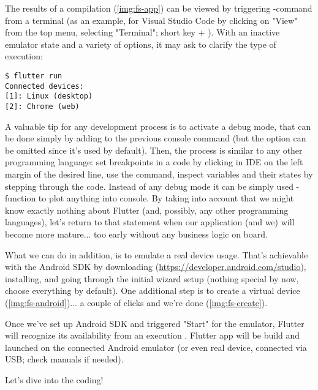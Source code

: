 \noindent The results of a compilation (\cref{img:fs-app}) can be viewed by triggering -command from a 
terminal (as an example, for Visual Studio Code by clicking on "View" from the top menu, selecting "Terminal"; short 
key  + ). With an inactive emulator state and a variety of options, it may ask to clarify 
the type of execution:

\begin{lstlisting}[language=terminal]
$ flutter run
Connected devices:
[1]: Linux (desktop)
[2]: Chrome (web)
\end{lstlisting}


\noindent A valuable tip for any development process is to activate a debug mode, that can be done simply by adding 
 to the previous console command (but the option can be omitted since it's used by default). Then, 
the process is similar to any other programming language: set breakpoints in a code by clicking in IDE on the left 
margin of the desired line, use the command, inspect variables and their states by stepping through the code. Instead 
of any debug mode it can be simply used -function to plot anything into console. By taking into account that 
we might know exactly nothing about Flutter (and, possibly, any other programming languages), let's return to that 
statement when our application (and we) will become more mature... too early without any business logic on board.

What we can do in addition, is to emulate a real device usage. That's achievable with the Android SDK by downloading 
(\href{https://developer.android.com/studio}{https://developer.android.com/studio}), installing, and going through 
the initial wizard setup (nothing special by now, choose everything by default). One additional step is to create a 
virtual device (\cref{img:fs-android})... a couple of clicks and we're done (\cref{img:fs-create}).

Once we've set up Android SDK and triggered "Start" for the emulator, Flutter will recognize its availability from
an execution . Flutter app will be build and launched on the connected Android emulator (or even real 
device, connected via USB; check manuals if needed).\\


\noindent Let's dive into the coding!
